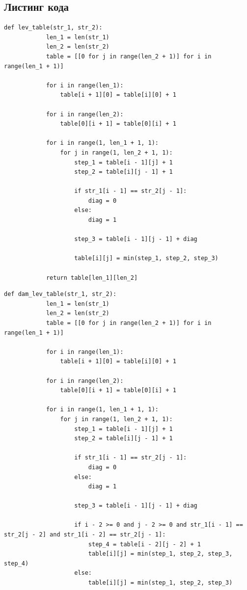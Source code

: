 \documentclass[a4paper, 14pt]{article}
\begin{document}
\begin{center}
        \subsection{Листинг кода}
        \begin{flushleft}
        \parindent=1cm
        \begin{lstlisting}[label=some-code,caption=Функция нахождения расстояния Левенштейна итеративно]
  		def lev_table(str_1, str_2):
			len_1 = len(str_1)
			len_2 = len(str_2)
			table = [[0 for j in range(len_2 + 1)] for i in range(len_1 + 1)]

			for i in range(len_1):
				table[i + 1][0] = table[i][0] + 1

			for i in range(len_2):
				table[0][i + 1] = table[0][i] + 1

			for i in range(1, len_1 + 1, 1):
				for j in range(1, len_2 + 1, 1):
					step_1 = table[i - 1][j] + 1
					step_2 = table[i][j - 1] + 1

					if str_1[i - 1] == str_2[j - 1]:
						diag = 0
					else:
						diag = 1

					step_3 = table[i - 1][j - 1] + diag

					table[i][j] = min(step_1, step_2, step_3)

			return table[len_1][len_2]
        \end{lstlisting}
        \newpage
        \begin{lstlisting}[label=some-code,caption=Функция нахождения расстояния Дамерау-Левенштейна итеративно]
		def dam_lev_table(str_1, str_2):
			len_1 = len(str_1)
			len_2 = len(str_2)
			table = [[0 for j in range(len_2 + 1)] for i in range(len_1 + 1)]

			for i in range(len_1):
				table[i + 1][0] = table[i][0] + 1

			for i in range(len_2):
				table[0][i + 1] = table[0][i] + 1

			for i in range(1, len_1 + 1, 1):
				for j in range(1, len_2 + 1, 1):
					step_1 = table[i - 1][j] + 1
					step_2 = table[i][j - 1] + 1

					if str_1[i - 1] == str_2[j - 1]:
						diag = 0
					else:
						diag = 1

					step_3 = table[i - 1][j - 1] + diag

					if i - 2 >= 0 and j - 2 >= 0 and str_1[i - 1] == str_2[j - 2] and str_1[i - 2] == str_2[j - 1]:
						step_4 = table[i - 2][j - 2] + 1
						table[i][j] = min(step_1, step_2, step_3, step_4)
					else:
						table[i][j] = min(step_1, step_2, step_3)


\end{lstlisting}
\end{flushleft}
\end{center}
\end{document}
